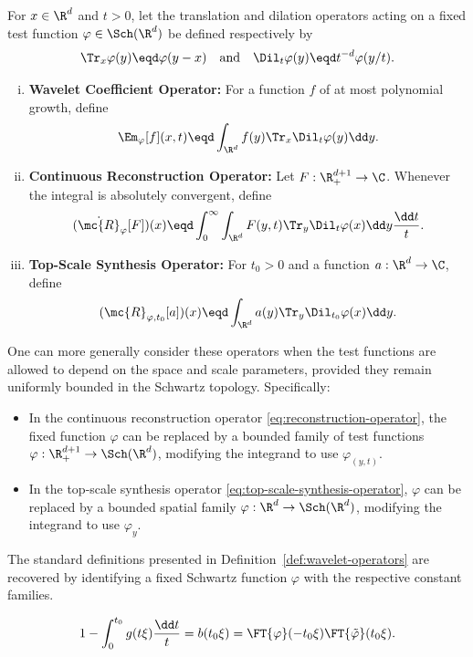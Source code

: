 \begin{definition} \label{def:wavelet-operators} For $x \in \R^d$ and $t > 0$, let the translation and dilation operators acting on a fixed test function $\varphi \in \Sch(\R^d)$ be defined respectively by
\[
\Tr_x\varphi(y) \eqd \varphi(y-x) \quad \text{and} \quad \Dil_t\varphi(y) \eqd t^{-d}\varphi(y/t).
\]
\begin{enumerate}[(i)]
\item \textbf{Wavelet Coefficient Operator:} For a function $f$ of at most polynomial growth, define
\begin{equation} \label{eq:wavelet-coefficient-fixed-test}
\Em_{\varphi}[f](x,t) \eqd \int_{\R^d} f(y)\Tr_x\Dil_t\varphi(y)\dd y.
\end{equation}

\item \textbf{Continuous Reconstruction Operator:} Let $F:\R^{d+1}_+\to\C$.
Whenever the integral is absolutely convergent, define
\begin{equation} \label{eq:reconstruction-operator}
(\dot{\mc{R}}_{\varphi}[F])(x) \eqd \int_0^\infty \int_{\R^d} F(y,t)\Tr_y\Dil_t\varphi(x) \dd y\frac{\dd t}{t}.
\end{equation}

\item \textbf{Top-Scale Synthesis Operator:} For $t_0>0$ and a function $a:\R^d\to\C$, define
\begin{equation} \label{eq:top-scale-synthesis-operator}
(\mc{R}_{\varphi,t_0}[a])(x) \eqd \int_{\R^d} a(y)\Tr_y\Dil_{t_0}\varphi(x)\dd y.
\end{equation}
\end{enumerate}
\end{definition}

\begin{remark} \label{rem:variable-test-functions} One can more generally consider these operators when the test functions are allowed to depend on the space and scale parameters, provided they remain uniformly bounded in the Schwartz topology.
Specifically:
\begin{itemize}
\item In the continuous reconstruction operator \eqref{eq:reconstruction-operator}, the fixed function $\varphi$ can be replaced by a bounded family of test functions $\varphi: \R^{d+1}_+ \to \Sch(\R^d)$, modifying the integrand to use $\varphi_{(y,t)}$.
\item In the top-scale synthesis operator \eqref{eq:top-scale-synthesis-operator}, $\varphi$ can be replaced by a bounded spatial family $\varphi: \R^d \to \Sch(\R^d)$, modifying the integrand to use $\varphi_y$.
\end{itemize}
The standard definitions presented in Definition~\ref{def:wavelet-operators} are recovered by identifying a fixed Schwartz function $\varphi$ with the respective constant families.
\end{remark}
\[
1-\int_0^{t_0}g(t\xi)\frac{\dd t}{t}
=
b(t_0\xi)
=
\FT{\varphi}(-t_0\xi)\FT{\tilde{\varphi}}(t_0\xi).
\]

